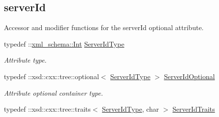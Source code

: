 \subsection*{serverId}
\label{_amgrp0c0cf4bb857157aed1d0895613aad955}
Accessor and modifier functions for the serverId optional attribute. \begin{DoxyCompactItemize}
\item 
\hypertarget{classopenstack_1_1xml_1_1Image_a55fc26e3d730377de0d1e09a64e38a7f}{
typedef ::\hyperlink{namespacexml__schema_a12d975a13061c938969b2b5143e97645}{xml\_\-schema::Int} \hyperlink{classopenstack_1_1xml_1_1Image_a55fc26e3d730377de0d1e09a64e38a7f}{ServerIdType}}
\label{classopenstack_1_1xml_1_1Image_a55fc26e3d730377de0d1e09a64e38a7f}

\begin{DoxyCompactList}\small\item\em Attribute type. \item\end{DoxyCompactList}\item 
\hypertarget{classopenstack_1_1xml_1_1Image_aa1db490914d5f6ed32aac0485675dead}{
typedef ::xsd::cxx::tree::optional$<$ \hyperlink{classopenstack_1_1xml_1_1Image_a55fc26e3d730377de0d1e09a64e38a7f}{ServerIdType} $>$ \hyperlink{classopenstack_1_1xml_1_1Image_aa1db490914d5f6ed32aac0485675dead}{ServerIdOptional}}
\label{classopenstack_1_1xml_1_1Image_aa1db490914d5f6ed32aac0485675dead}

\begin{DoxyCompactList}\small\item\em Attribute optional container type. \item\end{DoxyCompactList}\item 
\hypertarget{classopenstack_1_1xml_1_1Image_a77f4db5878e5aff470fda96f8dbb69ec}{
typedef ::xsd::cxx::tree::traits$<$ \hyperlink{classopenstack_1_1xml_1_1Image_a55fc26e3d730377de0d1e09a64e38a7f}{ServerIdType}, char $>$ \hyperlink{classopenstack_1_1xml_1_1Image_a77f4db5878e5aff470fda96f8dbb69ec}{ServerIdTraits}}
\label{classopenstack_1_1xml_1_1Image_a77f4db5878e5aff470fda96f8dbb69ec}


\end{DoxyCompactItemize}
